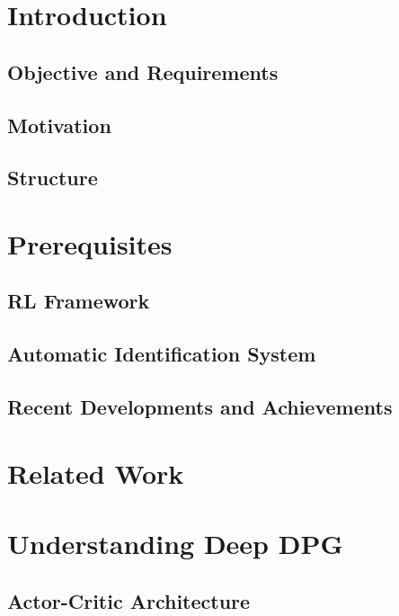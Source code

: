 \section{Introduction}
 \label{chap:intro}
    \subsection{Objective and Requirements}
    
    \subsection{Motivation}
    
    \subsection{Structure}
    
    
\newpage
\section{Prerequisites}\label{chap:prerequisites}
    \subsection{RL Framework}\label{chap:rlframework}
    
    \subsection{Automatic Identification System}
    
    \subsection{Recent Developments and Achievements}
    
\newpage
\section{Related Work}\label{chap:relatedWork}


\newpage
\section{Understanding Deep DPG}\label{chap:DDPG}

    \subsection{Actor-Critic Architecture}
    
